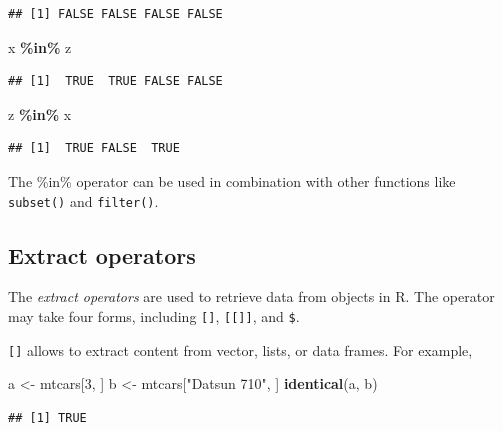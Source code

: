 \documentclass[
  12pt,
  oneside]{book}
\newenvironment{Shaded}{\begin{snugshade}}{\end{snugshade}}
\newcommand{\DecValTok}[1]{\textcolor[rgb]{0.00,0.00,0.81}{#1}}
\newcommand{\FunctionTok}[1]{\textcolor[rgb]{0.13,0.29,0.53}{\textbf{#1}}}
\newcommand{\NormalTok}[1]{#1}
\newcommand{\OtherTok}[1]{\textcolor[rgb]{0.56,0.35,0.01}{#1}}
\newcommand{\SpecialCharTok}[1]{\textcolor[rgb]{0.81,0.36,0.00}{\textbf{#1}}}
\newcommand{\StringTok}[1]{\textcolor[rgb]{0.31,0.60,0.02}{#1}}
\theoremstyle{definition}
\theoremstyle{definition}
\theoremstyle{definition}
\theoremstyle{definition}
\theoremstyle{remark}
\begin{document}
\begin{verbatim}
## [1] FALSE FALSE FALSE FALSE
\end{verbatim}

\begin{Shaded}
\begin{Highlighting}[]
\NormalTok{x }\SpecialCharTok{\%in\%}\NormalTok{ z  }
\end{Highlighting}
\end{Shaded}

\begin{verbatim}
## [1]  TRUE  TRUE FALSE FALSE
\end{verbatim}

\begin{Shaded}
\begin{Highlighting}[]
\NormalTok{z }\SpecialCharTok{\%in\%}\NormalTok{ x}
\end{Highlighting}
\end{Shaded}

\begin{verbatim}
## [1]  TRUE FALSE  TRUE
\end{verbatim}

The \%in\% operator can be used in combination with other functions like \texttt{subset()} and \texttt{filter()}.

\hypertarget{extract-operators}{%
\subsection{Extract operators}\label{extract-operators}}

The \emph{extract operators} are used to retrieve data from objects in R. The operator may take four forms, including \texttt{{[}{]}}, \texttt{{[}{[}{]}{]}}, and \texttt{\$}.

\texttt{{[}{]}} allows to extract content from vector, lists, or data frames. For example,

\begin{Shaded}
\begin{Highlighting}[]
\NormalTok{a }\OtherTok{\textless{}{-}}\NormalTok{ mtcars[}\DecValTok{3}\NormalTok{, ]}
\NormalTok{b }\OtherTok{\textless{}{-}}\NormalTok{ mtcars[}\StringTok{"Datsun 710"}\NormalTok{, ]}
\FunctionTok{identical}\NormalTok{(a, b)}
\end{Highlighting}
\end{Shaded}

\begin{verbatim}
## [1] TRUE
\end{verbatim}
\end{document}
